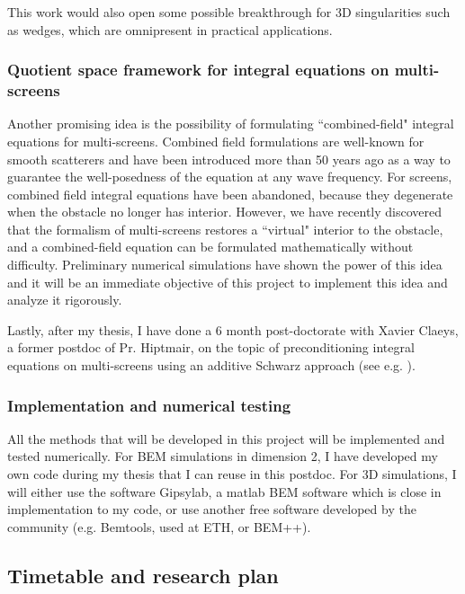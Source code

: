 \documentclass[]{article}
\begin{document}
This work would also open some possible breakthrough for 3D singularities such as wedges, which are omnipresent in practical applications. 

\subsubsection*{Quotient space framework for integral equations on multi-screens}

Another promising idea is the possibility of formulating ``combined-field" integral equations for multi-screens. Combined field formulations are well-known for smooth scatterers and have been introduced more than 50 years ago \cite{brakhage1965dirichletsehe} as a way to guarantee the well-posedness of the equation at any wave frequency. For screens, combined field integral equations have been abandoned, because they degenerate when the obstacle no longer has interior. 
However, we have recently discovered that the formalism of multi-screens restores a ``virtual" interior to the obstacle, and a combined-field equation can be formulated mathematically without difficulty. Preliminary numerical simulations have shown the power of this idea and it will be an immediate objective of this project to implement this idea and analyze it rigorously.

Lastly, after my thesis, I have done a 6 month post-doctorate with Xavier Claeys, a former postdoc of Pr. Hiptmair, on the topic of preconditioning integral equations on multi-screens using an additive Schwarz approach (see e.g. \cite{marchand2019two}).

\subsubsection*{Implementation and numerical testing}

All the methods that will be developed in this project will be implemented and tested numerically. For BEM simulations in dimension 2, I have developed my own code during my thesis that I can reuse in this postdoc. For 3D simulations, I will either use the software Gipsylab, a matlab BEM software which is close in implementation to my code, or use another free software developed by the community (e.g. Bemtools, used at ETH, or BEM++).



\subsection*{Timetable and research plan}
\end{document}
